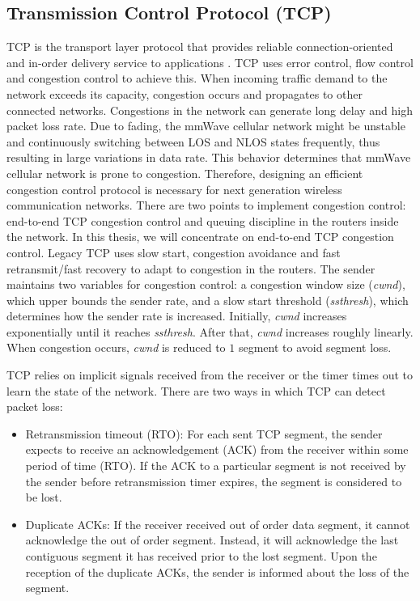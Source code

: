 \subsection{Transmission Control Protocol (TCP)}
\label{subsec:3}
\par TCP is the transport layer protocol that provides reliable connection-oriented and in-order delivery service to applications \cite{panwar2004tcp}. TCP uses error control, flow control and congestion control to achieve this. When incoming traffic demand to the network exceeds its capacity, congestion occurs and propagates to other connected networks. Congestions in the network can generate long delay and high packet loss rate. Due to fading, the mmWave cellular network might be unstable and continuously switching between LOS and NLOS states frequently, thus resulting in large variations in data rate. This behavior determines that mmWave cellular network is prone to congestion. Therefore, designing an efficient congestion control protocol is necessary for next generation wireless communication networks. There are two points to implement congestion control: end-to-end TCP congestion control and queuing discipline in the routers inside the network. In this thesis, we will concentrate on end-to-end TCP congestion control. Legacy TCP uses slow start, congestion avoidance and fast retransmit/fast recovery to adapt to congestion in the routers. The sender maintains two variables for congestion control: a congestion window size (\emph{cwnd}), which upper bounds the sender rate, and a slow start threshold (\emph{ssthresh}), which determines how the sender rate is increased. Initially, \emph{cwnd} increases exponentially until it reaches \emph{ssthresh}. After that, \emph{cwnd} increases roughly linearly. When congestion occurs, \emph{cwnd} is reduced to $1$ segment to avoid segment loss. 
\par TCP relies on implicit signals received from the receiver or the timer times out to learn the state of the network. There are two ways in which TCP can detect packet loss: 
\begin{itemize}
\item Retransmission timeout (RTO): For each sent TCP segment, the sender expects to receive an acknowledgement (ACK) from the receiver within some period of time (RTO). If the ACK to a particular segment is not received by the sender before retransmission timer expires, the segment is considered to be lost. 
\item Duplicate ACKs: If the receiver received out of order data segment, it cannot acknowledge the out of order segment. Instead, it will acknowledge the last contiguous segment it has received prior to the lost segment. Upon the reception of the duplicate ACKs, the sender is informed about the loss of the segment.
\end{itemize}
